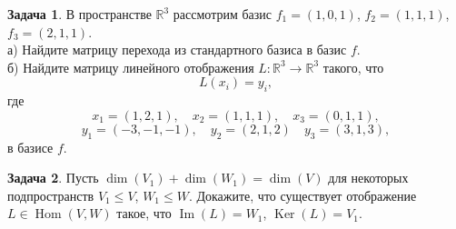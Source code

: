 \documentclass[12pt, fleqn]{extarticle}
\newcommand{\real}{\mathbb{R}}
\DeclareMathOperator{\Kernel}{Ker}
\DeclareMathOperator{\Image}{Im}
\DeclareMathOperator{\Hom}{Hom}
\theoremstyle{definition}
\newtheorem{problem}{Задача}
\theoremstyle{remark}
\begin{document}
\begin{problem}
В пространстве $\real^3$ 
рассмотрим базис $f_1 = (1, 0, 1)$, $f_2=(1, 1, 1)$, $f_3=(2, 1, 1)$. \\
а) Найдите матрицу перехода из стандартного базиса в базис $f$.\\
б) Найдите матрицу линейного отображения $L\colon \real^3\to \real^3$ такого, что 
$$L(x_i)=y_i,$$ 
где 
$$x_1 = (1, 2, 1), \quad x_2 = (1, 1, 1), \quad x_3 = (0, 1, 1),$$
$$y_1=(-3, -1, -1), \quad y_2 = (2, 1, 2) \quad y_3 = (3, 1, 3),$$
в базисе $f$.
\end{problem}

\begin{problem}
Пусть $\dim(V_{1}) + \dim(W_{1}) = \dim(V)$ для некоторых 
подпространств $V_{1} \leqslant V$, $W_{1} \leqslant W$.
Докажите, что существует отображение
$L \in \Hom(V, W)$ такое, что 
$\Image(L) = W_{1}$, $\Kernel(L) = V_{1}$.
\end{problem}
\end{document}
